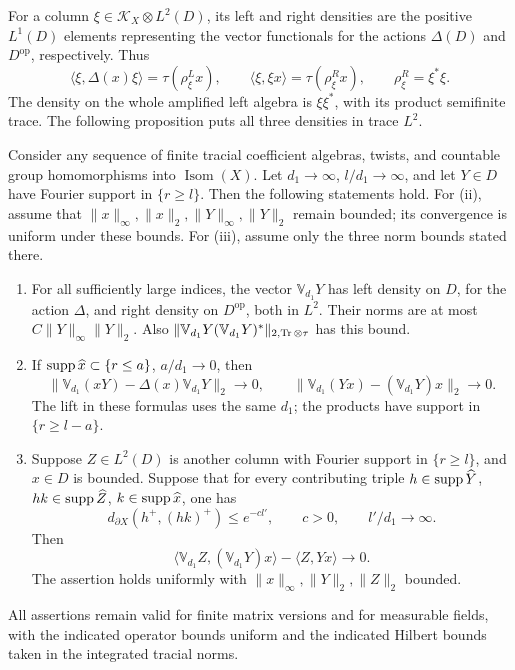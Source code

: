 For a column \(\xi\in\mathcal K_X\otimes L^2(D)\), its left and
right densities are the positive \(L^1(D)\) elements representing
the vector functionals for the actions \(\Delta(D)\) and
\(D^{\mathrm{op}}\), respectively.  Thus
\[
 \langle\xi,\Delta(x)\xi\rangle=\tau(\rho^L_\xi x),\qquad
 \langle\xi,\xi x\rangle=\tau(\rho^R_\xi x),\qquad
 \rho^R_\xi=\xi^*\xi.
\]
The density on the whole amplified left algebra is \(\xi\xi^*\),
with its product semifinite trace.  The following proposition puts
all three densities in trace \(L^2\).

\begin{proposition}\label{prop:ray-lift}
Consider any sequence of finite tracial coefficient algebras, twists,
and countable group homomorphisms into \(\operatorname{Isom}(X)\).
Let \({d_1}\to\infty\), \(l/{d_1}\to\infty\), and let \(Y\in D\) have Fourier
support in \(\{r\ge l\}\).  Then the following statements hold.
For \textup{(ii)}, assume that
\(\|x\|_\infty,\|x\|_2,\|Y\|_\infty,\|Y\|_2\) remain bounded;
its convergence is uniform under these bounds.
For \textup{(iii)}, assume only the three norm bounds stated there.
\begin{enumerate}[label=(\roman*)]
\item For all sufficiently large indices, the vector \(\mathbb V_{d_1}Y\)
has left density on \(D\), for the
action \(\Delta\), and right density on \(D^{\mathrm{op}}\), both in
\(L^2\).  Their norms are at most
\(C\|Y\|_\infty\|Y\|_2\).  Also
\(\|\mathbb V_{d_1}Y(\mathbb V_{d_1}Y)^*\|_{2,\operatorname{Tr}\otimes\tau}\)
has this bound.
\item If \(\operatorname{supp}\widehat x\subset\{r\le a\}\), \(a/{d_1}\to0\), then
\[
 \|\mathbb V_{d_1}(xY)-\Delta(x)\mathbb V_{d_1}Y\|_2\longrightarrow0,
 \qquad
 \|\mathbb V_{d_1}(Yx)-(\mathbb V_{d_1}Y)x\|_2\longrightarrow0.
\]
The lift in these formulas uses the same \({d_1}\); the products have
support in \(\{r\ge l-a\}\).
\item Suppose \(Z\in L^2(D)\) is another column with Fourier support
in \(\{r\geq l\}\), and \(x\in D\) is bounded.
Suppose that for every contributing triple
\(h\in\operatorname{supp}\widehat Y\), \(hk\in\operatorname{supp}\widehat Z\),
\(k\in\operatorname{supp}\widehat x\), one has
\[
 d_{\partial X}(h^+,(hk)^+)\le e^{-c l'},
 \qquad c>0,\qquad l'/{d_1}\longrightarrow\infty.
\]
Then
\begin{equation}\label{eq:ray-close-pairing}
 \langle\mathbb V_{d_1}Z,(\mathbb V_{d_1}Y)x\rangle
                         -\langle Z,Yx\rangle\longrightarrow0.
\end{equation}
The assertion holds uniformly with
\(\|x\|_\infty,\|Y\|_2,\|Z\|_2\) bounded.
\end{enumerate}
All assertions remain valid for finite matrix versions and for
measurable fields, with the indicated operator bounds uniform and the
indicated Hilbert bounds taken in the integrated tracial norms.
\end{proposition}

